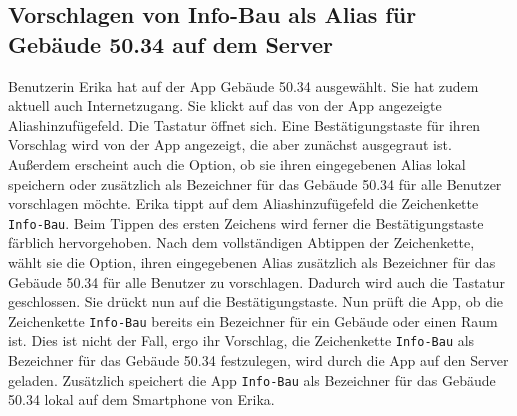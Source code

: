 \subsection{Vorschlagen von Info-Bau als Alias für Gebäude 50.34 auf dem Server}

Benutzerin Erika hat auf der App Gebäude 50.34 ausgewählt. Sie hat zudem aktuell auch Internetzugang. Sie klickt auf das von der App angezeigte Aliashinzufügefeld. Die Tastatur öffnet sich. Eine Bestätigungstaste für ihren Vorschlag wird von der App angezeigt, die aber zunächst ausgegraut ist. Außerdem erscheint auch die Option, ob sie ihren eingegebenen Alias lokal speichern oder zusätzlich als Bezeichner für das Gebäude 50.34 für alle Benutzer vorschlagen möchte. Erika tippt auf dem Aliashinzufügefeld die Zeichenkette \texttt{Info-Bau}. Beim Tippen des ersten Zeichens wird ferner die Bestätigungstaste färblich hervorgehoben. Nach dem vollständigen Abtippen der Zeichenkette, wählt sie die Option, ihren eingegebenen Alias zusätzlich als Bezeichner für das Gebäude 50.34 für alle Benutzer zu vorschlagen. Dadurch wird auch die Tastatur geschlossen. Sie drückt nun auf die Bestätigungstaste. Nun prüft die App, ob die Zeichenkette \texttt{Info-Bau} bereits ein Bezeichner für ein Gebäude oder einen Raum ist. Dies ist nicht der Fall, ergo ihr Vorschlag, die Zeichenkette \texttt{Info-Bau} als Bezeichner für das Gebäude 50.34 festzulegen, wird durch die App auf den Server geladen. Zusätzlich speichert die App \texttt{Info-Bau} als Bezeichner für das Gebäude 50.34 lokal auf dem Smartphone von Erika.